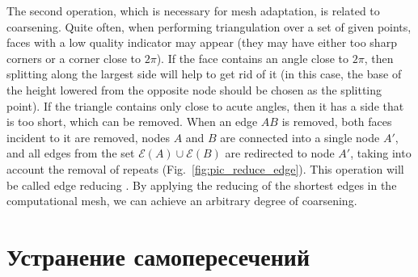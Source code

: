 \documentclass[
11pt,%
tightenlines,%
twoside,%
onecolumn,%
nofloats,%
nobibnotes,%
nofootinbib,%
superscriptaddress,%
noshowpacs,%
centertags]%
{revtex4}
\begin{document}
The second operation, which is necessary for mesh adaptation, is related to coarsening.
Quite often, when performing triangulation over a set of given points, faces with a low quality indicator may appear (they may have either too sharp corners or a corner close to $2 \pi$).
If the face contains an angle close to $2 \pi$, then splitting along the largest side will help to get rid of it (in this case, the base of the height lowered from the opposite node should be chosen as the splitting point).
If the triangle contains only close to acute angles, then it has a side that is too short, which can be removed.
When an edge $AB$ is removed, both faces incident to it are removed, nodes $A$ and $B$ are connected into a single node $A'$, and all edges from the set $\mathscr{E}(A) \cup \mathscr{E} (B)$ are redirected to node $A'$, taking into account the removal of repeats (Fig.~\ref{fig:pic_reduce_edge}).
This operation will be called edge reducing \cite{Panchal}.
By applying the reducing of the shortest edges in the computational mesh, we can achieve an arbitrary degree of coarsening.


\section{Устранение самопересечений}
\end{document}

